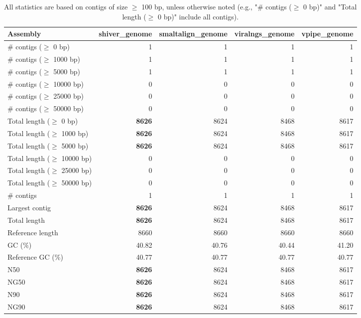 \documentclass[12pt,a4paper]{article}
\begin{document}
\begin{table}[ht]
\begin{center}
\caption{All statistics are based on contigs of size $\geq$ 100 bp, unless otherwise noted (e.g., "\# contigs ($\geq$ 0 bp)" and "Total length ($\geq$ 0 bp)" include all contigs).}
\begin{tabular}{|l*{4}{|r}|}
\hline
Assembly & shiver\_genome & smaltalign\_genome & viralngs\_genome & vpipe\_genome \\ \hline
\# contigs ($\geq$ 0 bp) & 1 & 1 & 1 & 1 \\ \hline
\# contigs ($\geq$ 1000 bp) & 1 & 1 & 1 & 1 \\ \hline
\# contigs ($\geq$ 5000 bp) & 1 & 1 & 1 & 1 \\ \hline
\# contigs ($\geq$ 10000 bp) & 0 & 0 & 0 & 0 \\ \hline
\# contigs ($\geq$ 25000 bp) & 0 & 0 & 0 & 0 \\ \hline
\# contigs ($\geq$ 50000 bp) & 0 & 0 & 0 & 0 \\ \hline
Total length ($\geq$ 0 bp) & {\bf 8626} & 8624 & 8468 & 8617 \\ \hline
Total length ($\geq$ 1000 bp) & {\bf 8626} & 8624 & 8468 & 8617 \\ \hline
Total length ($\geq$ 5000 bp) & {\bf 8626} & 8624 & 8468 & 8617 \\ \hline
Total length ($\geq$ 10000 bp) & 0 & 0 & 0 & 0 \\ \hline
Total length ($\geq$ 25000 bp) & 0 & 0 & 0 & 0 \\ \hline
Total length ($\geq$ 50000 bp) & 0 & 0 & 0 & 0 \\ \hline
\# contigs & 1 & 1 & 1 & 1 \\ \hline
Largest contig & {\bf 8626} & 8624 & 8468 & 8617 \\ \hline
Total length & {\bf 8626} & 8624 & 8468 & 8617 \\ \hline
Reference length & 8660 & 8660 & 8660 & 8660 \\ \hline
GC (\%) & 40.82 & 40.76 & 40.44 & 41.20 \\ \hline
Reference GC (\%) & 40.77 & 40.77 & 40.77 & 40.77 \\ \hline
N50 & {\bf 8626} & 8624 & 8468 & 8617 \\ \hline
NG50 & {\bf 8626} & 8624 & 8468 & 8617 \\ \hline
N90 & {\bf 8626} & 8624 & 8468 & 8617 \\ \hline
NG90 & {\bf 8626} & 8624 & 8468 & 8617 \\ \hline

\end{tabular}
\end{center}
\end{table}
\end{document}
